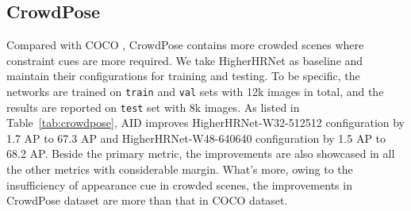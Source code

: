 \documentclass[final]{cvpr}
\begin{document}
\subsection{CrowdPose}
Compared with COCO \cite{COCO}, CrowdPose \cite{Crowdpose} contains more crowded scenes where constraint cues are more required. We take HigherHRNet \cite{Higher} as baseline and maintain their configurations for training and testing. To be specific, the networks are trained on \texttt{train} and \texttt{val} sets with 12k images in total, and the results are reported on \texttt{test} set with 8k images. As listed in Table~\ref{tab:crowdpose}, AID improves HigherHRNet-W32-512512 configuration by 1.7 AP to 67.3 AP and HigherHRNet-W48-640640 configuration by 1.5 AP to 68.2 AP. Beside the primary metric, the improvements are also showcased in all the other metrics with considerable margin. What's more, owing to the insufficiency of appearance cue in crowded scenes, the improvements in CrowdPose dataset are more than that in COCO dataset.
\end{document}
